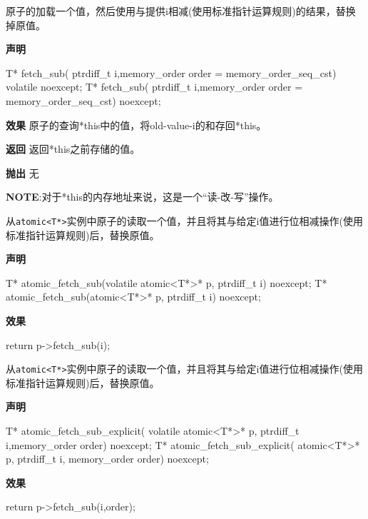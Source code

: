 
原子的加载一个值，然后使用与提供i相减(使用标准指针运算规则)的结果，替换掉原值。

\textbf{声明}

\begin{cpp}
T* fetch_sub(
    ptrdiff_t i,memory_order order = memory_order_seq_cst)
    volatile noexcept;
T* fetch_sub(
    ptrdiff_t i,memory_order order = memory_order_seq_cst) noexcept;
\end{cpp}

\textbf{效果}
原子的查询*this中的值，将old-value-i的和存回*this。

\textbf{返回}
返回*this之前存储的值。

\textbf{抛出}
无

\textbf{NOTE}:对于*this的内存地址来说，这是一个“读-改-写”操作。


从\texttt{atomic<T*>}实例中原子的读取一个值，并且将其与给定i值进行位相减操作(使用标准指针运算规则)后，替换原值。

\textbf{声明}

\begin{cpp}
T* atomic_fetch_sub(volatile atomic<T*>* p, ptrdiff_t i) noexcept;
T* atomic_fetch_sub(atomic<T*>* p, ptrdiff_t i) noexcept;
\end{cpp}

\textbf{效果}

\begin{cpp}
return p->fetch_sub(i);
\end{cpp}


从\texttt{atomic<T*>}实例中原子的读取一个值，并且将其与给定i值进行位相减操作(使用标准指针运算规则)后，替换原值。

\textbf{声明}

\begin{cpp}
T* atomic_fetch_sub_explicit(
     volatile atomic<T*>* p, ptrdiff_t i,memory_order order) noexcept;
T* atomic_fetch_sub_explicit(
     atomic<T*>* p, ptrdiff_t i, memory_order order) noexcept;
\end{cpp}

\textbf{效果}

\begin{cpp}
return p->fetch_sub(i,order);
\end{cpp}


